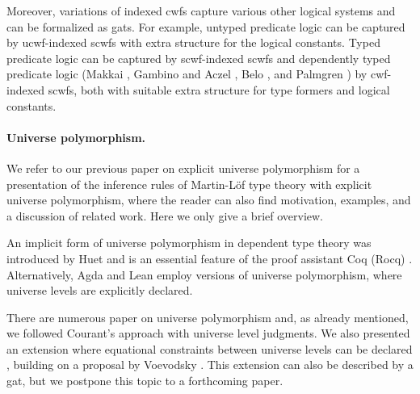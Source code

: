 \documentclass[11pt,a4paper]{article}
\theoremstyle{plain}
\theoremstyle{definition}
\begin{document}
Moreover, variations of indexed cwfs capture various other logical systems and can be formalized as gats. For example, untyped predicate logic can be captured by ucwf-indexed scwfs with extra structure for the logical constants. Typed predicate logic can be captured by scwf-indexed scwfs and dependently typed predicate logic (Makkai \cite{makkai:folds}, Gambino and Aczel \cite{gambino-aczel}, Belo \cite{belo}, and Palmgren \cite{Palmgren19}) by cwf-indexed scwfs, both with suitable extra structure for type formers and logical constants.

\paragraph{Universe polymorphism.} We refer to our previous paper on explicit universe polymorphism \cite{BezemCDE22} for a presentation of the inference rules of Martin-Löf type theory with explicit universe polymorphism, where the reader can also find motivation, examples, and a discussion of related work. Here we only give a brief overview.

An implicit form of universe polymorphism in dependent type theory was introduced by Huet \cite{Huet87} and is an essential feature of the proof assistant Coq (Rocq) \cite{coq:general}. Alternatively, Agda \cite{agda-wiki} and Lean \cite{moura:lean} employ versions of universe polymorphism, where universe levels are explicitly declared.

There are numerous paper on universe polymorphism \cite{} and, as already mentioned, we followed Courant's approach \cite{Courant02} with universe level judgments. We also presented an extension where equational constraints between universe levels can be declared \cite{BezemCDE22}, building on a proposal by Voevodsky \cite{VV}. This extension can also be described by a gat, but we postpone this topic to a forthcoming paper.
\end{document}
